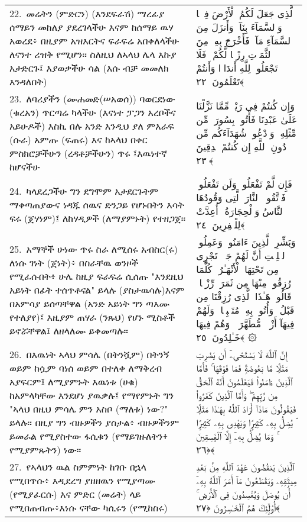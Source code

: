 \documentclass[11pt,a4paper,oneside]{article}%
\newcommand{\mytextarabic}[1]{\textarabic{ #1 \flushright}}
\begin{document}
\begin{longtable}{%
  @{}
    p{}
  @{~~~}
    p{}
    @{}
}
22.\ መሬትን (ምድርን) (እንደፍራሽ) ማረፊያ ሰማይን መከለያ ያደረገላችሁ እናም  ከሰማይ ዉሃ አወረደ፥ በዚያም አዝእርትና ፍራፍሬ አበቀለላችሁ ለናንተ ሪዝቅ የሚሆን። ስለዚህ ለኣላህ ሌላ እኩያ አታድርጉ፤ እያወቃችሁ ሳል (እሱ ብቻ መመለክ እንዳለበት) &  \mytextarabic{ٱلَّذِى جَعَلَ لَكُمُ ٱلْأَرْضَ فِرَٟشًۭا وَٱلسَّمَآءَ بِنَآءًۭ وَأَنزَلَ مِنَ ٱلسَّمَآءِ مَآءًۭ فَأَخْرَجَ بِهِۦ مِنَ ٱلثَّمَرَٟتِ رِزْقًۭا لَّكُمْ ۖ فَلَا تَجْعَلُوا۟ لِلَّهِ أَندَادًۭا وَأَنتُمْ تَعْلَمُونَ ﴿٢٢﴾}\\
23.\ ለባሪያችን (ሙሐመድ(ሠአወሰ)) ባወርደነው (ቁረአን) ጥርጣሬ ካላችሁ (እናነተ ፓጋን አረቦችና አይሁዶች) እስኪ በሉ አንድ እንዲህ ያለ ምእራፍ (ሱራ) አምጡ (ፍጠሩ) እና ከኣላህ በቀር ምስክሮቻችሁን (ረዳቶቻችሁን) ጥሩ ፤እዉነተኛ ከሆናችሁ &  \mytextarabic{وَإِن كُنتُمْ فِى رَيْبٍۢ مِّمَّا نَزَّلْنَا عَلَىٰ عَبْدِنَا فَأْتُوا۟ بِسُورَةٍۢ مِّن مِّثْلِهِۦ وَٱدْعُوا۟ شُهَدَآءَكُم مِّن دُونِ ٱللَّهِ إِن كُنتُمْ صَٟدِقِينَ ﴿٢٣﴾}\\
24.\ ካላደረጋችሁ ግን ደግሞም አታደርጉትም  ማቀጣጠያውና ነዳጁ ሰዉና ድንጋይ የሆኑበትን እሳት ፍሩ (ጀሃነም)፤ ለከሃዲዎች (ለማያምኑት) የተዘጋጀ። &  \mytextarabic{فَإِن لَّمْ تَفْعَلُوا۟ وَلَن تَفْعَلُوا۟ فَٱتَّقُوا۟ ٱلنَّارَ ٱلَّتِى وَقُودُهَا ٱلنَّاسُ وَٱلْحِجَارَةُ ۖ أُعِدَّتْ لِلْكَٟفِرِينَ ﴿٢٤﴾}\\
25.\ አማኞች ሁነው ጥሩ ስራ ለሚሰሩ አብስር(ሩ) ለነሱ ገነት (ጀነት)፥ በስራቸዉ ወንዞች የሚፈሱበት፥ ሁሌ ከዚያ ፍራፍሬ ሲሰጡ "እንደዚህ አይነት  በፊት ተሰጥቶናል" ይላሉ (ያስታዉሳሉ)እናም  በአምሳያ ይሰጣቸዋል (አንድ አይነት ግን ጣእሙ  የተለያየ)፤ እዚያም ጠሃራ (ንጹህ) የሆኑ ሚስቶች ይኖሯቸዋል፤ ለዘላለሙ ይቀመጣሉ። &  \mytextarabic{وَبَشِّرِ ٱلَّذِينَ ءَامَنُوا۟ وَعَمِلُوا۟ ٱلصَّٟلِحَٟتِ أَنَّ لَهُمْ جَنَّٟتٍۢ تَجْرِى مِن تَحْتِهَا ٱلْأَنْهَـٰرُ ۖ كُلَّمَا رُزِقُوا۟ مِنْهَا مِن ثَمَرَةٍۢ رِّزْقًۭا ۙ قَالُوا۟ هَـٰذَا ٱلَّذِى رُزِقْنَا مِن قَبْلُ ۖ وَأُتُوا۟ بِهِۦ مُتَشَٟبِهًۭا ۖ وَلَهُمْ فِيهَآ أَزْوَٟجٌۭ مُّطَهَّرَةٌۭ ۖ وَهُمْ فِيهَا خَـٰلِدُونَ ﴿٢٥﴾ ۞}\\
26.\ በእዉነት ኣላህ ምሳሌ (በትንሿም) በትንኝ ወይም ከሷም ባነሰ ወይም በተለቀ ለማቅረብ አያፍርም፤ ለሚያምኑት እዉነቱ (ሀቁ) ከአምላካቸው  እንደሆነ ያዉቃሉ፤ የማየምኑት ግን "ኣላህ በዚህ ምሳሌ ምን አስቦ (ማለቱ) ነው?" ይላሉ።  በዚያ ግን ብዙዎችን ያስታል፥ ብዙዎችንም ይመራል የሚያስተው ፋሲቁን (የማይገዙለትን፥ የሚያምጹትን) ነው። &  \mytextarabic{ إِنَّ ٱللَّهَ لَا يَسْتَحْىِۦٓ أَن يَضْرِبَ مَثَلًۭا مَّا بَعُوضَةًۭ فَمَا فَوْقَهَا ۚ فَأَمَّا ٱلَّذِينَ ءَامَنُوا۟ فَيَعْلَمُونَ أَنَّهُ ٱلْحَقُّ مِن رَّبِّهِمْ ۖ وَأَمَّا ٱلَّذِينَ كَفَرُوا۟ فَيَقُولُونَ مَاذَآ أَرَادَ ٱللَّهُ بِهَـٰذَا مَثَلًۭا ۘ يُضِلُّ بِهِۦ كَثِيرًۭا وَيَهْدِى بِهِۦ كَثِيرًۭا ۚ وَمَا يُضِلُّ بِهِۦٓ إِلَّا ٱلْفَٟسِقِينَ ﴿٢٦﴾}\\
27.\ የኣላህን ዉል ስምምነት ከገቡ በኋላ የሚበጥሱ፥ እዲደረግ ያዘዘዉን የሚያጣሙ (የሚያፈርሱ) እና ምድር (መሬት) ላይ የሚበጠብጡ፥እነሱ ናቸው ካሲሩን (የሚከስሩ) &  \mytextarabic{ٱلَّذِينَ يَنقُضُونَ عَهْدَ ٱللَّهِ مِنۢ بَعْدِ مِيثَٟقِهِۦ وَيَقْطَعُونَ مَآ أَمَرَ ٱللَّهُ بِهِۦٓ أَن يُوصَلَ وَيُفْسِدُونَ فِى ٱلْأَرْضِ ۚ أُو۟لَٟٓئِكَ هُمُ ٱلْخَـٰسِرُونَ ﴿٢٧﴾}\\

\end{longtable}
\end{document}
